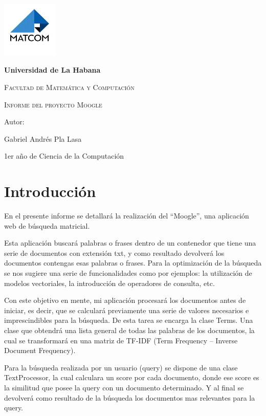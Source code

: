 \documentclass[a4paper,12pt]{report}
\begin{document}
\begin{titlepage}
    \centering
    {\includegraphics*[width=0.2\textwidth]{../Presentacion/fotos/matcom.jpg} \par}
    \vspace*{1cm}
    {\bfseries\LARGE Universidad de La Habana \par}
    \vspace*{1cm}
    {\scshape\Large Facultad de Matemática y Computación \par}
    \vspace*{3cm}
    {\scshape\Huge Informe del proyecto Moogle \par}
    \vfill
    {\Large Autor: \par}
    {\Large Gabriel Andrés Pla Lasa \par} 
    \vspace*{2cm}
    {\small 1er año de Ciencia de la Computación}
    \vfill
\end{titlepage}

\section*{Introducción} 

En el presente informe se detallará la realización del “Moogle”, una aplicación web de búsqueda
matricial.

Esta aplicación buscará palabras o frases dentro de un contenedor que tiene una serie de
documentos con extensión txt, y como resultado devolverá los documentos contengas esas palabras
o frases. Para la optimización de la búsqueda se nos sugiere una serie de funcionalidades como por
ejemplos: la utilización de modelos vectoriales, la introducción de operadores de consulta, etc.

Con este objetivo en mente, mi aplicación procesará los documentos antes de iniciar, es decir, que
se calculará previamente una serie de valores necesarios e imprescindibles para la búsqueda. De esta
tarea se encarga la clase Terms. Una clase que obtendrá una lista general de todas las palabras de los
documentos, la cual se transformará en una matriz de TF-IDF (Term Frequency – Inverse Document
Frequency).

Para la búsqueda realizada por un usuario (query) se dispone de una clase TextProcessor, la cual
calculara un score por cada documento, donde ese score es la similitud que posee la query con un
documento determinado. Y al final se devolverá como resultado de la búsqueda los documentos mas
relevantes para la query.
\end{document}
